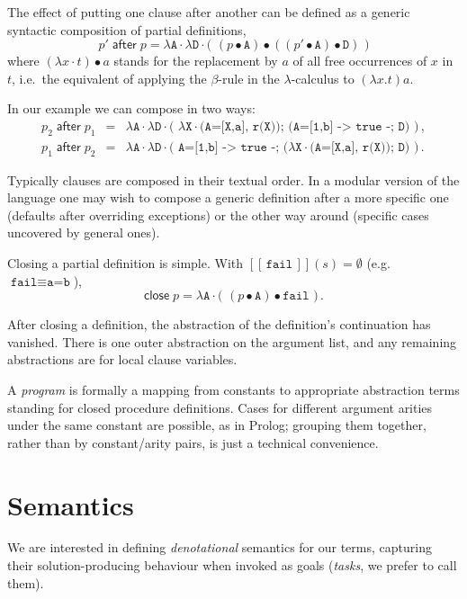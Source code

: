 \documentclass{tlp}
\def\denotstart{[\![\,}
\def\denotend{\,]\!]}
\def\denot#1{\denotstart#1\denotend}
\def\abstsym{\!\cdot\!}
\def\abst#1#2{\lambda#1\abstsym#2}
\def\abstt#1#2{\lambda\texttt{#1}\abstsym\texttt{#2}}
\def\maft{\;\textsf{after}\;}
\def\mclo{\textsf{close}\;}
\def\ff{\emptyset}
\newcommand{\apply}[2]{#1\bullet#2}
\begin{document}
The effect of putting one clause after another can be defined as a
generic syntactic composition of partial definitions,\\[-13pt]
\[p'\maft
p=\abstt{A}{$\abstt{D}{( $\apply{(\apply{p}\texttt{A})}{(\apply{(\apply{p'}\texttt{A})}\texttt{D})}$ )}$}\]
where $\apply{(\abst xt)}a$ stands for
the replacement by $a$ of all free occurrences of $x$ in $t$, i.e.\
the equivalent of applying the $\beta$-rule in the $\lambda$-calculus to
$(\lambda x.t)a$.
 
In our example we can compose in two ways:\\[-13pt]
\begin{eqnarray*}p_2\maft p_1&=&\abstt{A}{$\abstt{D}{( $\abstt{X}{(A=[X,a], r(X))}$; (A=[1,b] -> true -; D) )}$}\,,\\
p_1\maft p_2&=&\abstt{A}{$\abstt{D}{( A=[1,b] -> true -;
($\abstt{X}{(A=[X,a], r(X))}$; D) )}$}\,.
\end{eqnarray*}

Typically clauses are composed in their textual order. In a modular
version of the language one may wish to compose a generic definition after
a more specific one (defaults after overriding exceptions) or the other way
around (specific cases uncovered by general ones).

Closing a partial definition is simple. With
$\denot{\texttt{fail}}(s)=\ff$ (e.g.\ $\texttt{fail}\equiv\texttt{a=b}$),\\[-13pt]
\[\mclo p=\abstt{A}{( $\apply{(\apply p{\texttt{A}})}{\texttt{fail}}$ )}\,.\]

\noindent After closing a definition, the abstraction of the definition's
continuation has vanished. There is one outer abstraction on the argument list,
and any remaining abstractions are for local clause variables.

A \emph{program} is formally a mapping from constants to appropriate abstraction
terms standing for closed procedure definitions.  Cases for
different argument arities under the same constant are possible, as in
Prolog; grouping them together, rather than by
constant/arity pairs, is just a technical convenience.


 
\section{Semantics}

We are interested in defining \emph{denotational} semantics for our terms,
capturing their solution-producing behaviour when invoked as goals (\emph{tasks},
we prefer to call them).
\end{document}
